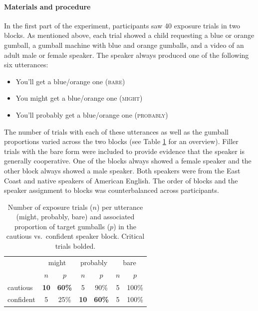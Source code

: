\paragraph{Materials and procedure}

 In the first part of the experiment, participants saw 40 exposure trials in two blocks. As mentioned above, each trial showed a child requesting a blue or orange gumball, a gumball machine with blue and orange gumballs, and a video of an adult male or female speaker. The speaker always produced one of the following six utterances:%
 
\begin{itemize}
\item You'll get a blue/orange one (\textsc{bare})
\item You might get a blue/orange one (\textsc{might})
\item You'll probably get a blue/orange one (\textsc{probably})
\end{itemize}


The number of trials with each of these utterances as well as the gumball proportions varied across the two blocks (see Table \ref{tab:materials} for an overview). Filler trials with the bare form were included to provide evidence that the speaker is generally cooperative. One of the blocks always showed a female speaker and the other block always showed a male speaker. Both speakers were from the East Coast and native speakers of American English. The order of blocks and the speaker assignment to blocks was counterbalanced across participants. 

\begin{table}
\centering
\begin{tabular}{l c c c c c c}
\toprule
& \multicolumn{2}{c}{\sc might} & \multicolumn{2}{c}{\sc probably} & \multicolumn{2}{c}{\sc bare}\\
& $n$ & $p$ & $n$ & $p$ & $n$ & $p$\\
\midrule
cautious & {\bf 10} & {\bf 60\%} & 5 & 90\% & 5 & 100\%\\
confident & 5 & 25\% & {\bf 10}  & {\bf 60\%} & 5  & 100\%\\  
\bottomrule
\end{tabular}
\caption{Number of exposure trials ($n$) per utterance ({\sc might}, {\sc probably}, {\sc bare}) and associated proportion of target gumballs ($p$) in the cautious vs.~confident speaker block. Critical trials bolded. \label{tab:materials}}

\end{table}

